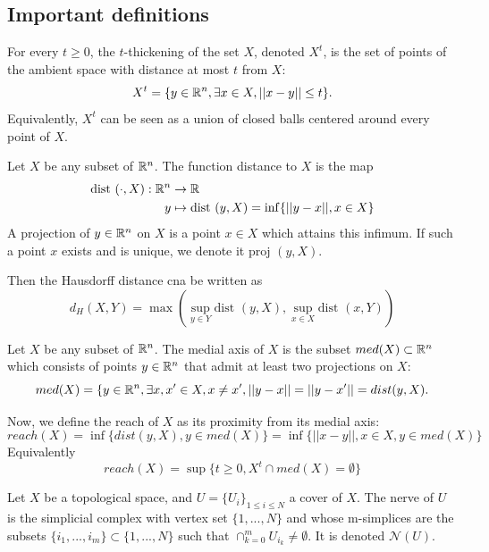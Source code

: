 \subsection{Important definitions}

\begin{definition}
    For every $t \ge 0$, the $t$-thickening of the set $X$, denoted $X^t$, is
    the set of points of the ambient space with distance at most $t$ from $X$:
    $$X^t = \{y \in \mathbb{R}^n, \exists x \in X, ||x - y|| \le t\}.$$
    Equivalently, $X^t$ can be seen as a union of closed balls centered around
    every point of $X$.
\end{definition}

\begin{definition}
    Let $X$ be any subset of $\mathbb{R}^n$. The function distance to $X$ is the map 
    \begin{align*}
        \text{dist }(\cdot, X) : \mathbb{R}^n &\rightarrow \mathbb{R} \\
        y &\mapsto \text{dist }(y, X) = \inf\{||y - x||, x \in X\}
    \end{align*}
    A projection of $y \in \mathbb{R}^n$ on $X$ is a point $x \in X$ which attains
    this infimum. If such a point $x$ exists and is unique, we denote it
    $\text{proj }(y, X)$. 

    Then the Hausdorff distance cna be written as 
    $$
    d_H(X, Y) = \max(\sup_{y\in Y} \text{dist }(y, X), \sup_{x\in X} \text{dist }(x, Y))$$
\end{definition}

\begin{definition}
    Let $X$ be any subset of $\mathbb{R}^n$. The medial axis of $X$ is the subset
    $med(X) \subset \mathbb{R}^n$ which consists of points $y \in \mathbb{R}^n$ that admit at
    least two projections on $X$:
    $$
    med(X) = \{y \in \mathbb{R}^n, \exists x, x' \in X, x \neq x', ||y - x|| = ||y - x'|| = dist(y, X)
    .$$
\end{definition}

\begin{definition}
    Now, we define the reach of $X$ as its proximity from its medial axis:
    $$
    reach(X) = \inf\{dist(y, X), y \in med (X)\} = \inf\{||x - y||, x \in X, y \in med (X)\}
    $$
    Equivalently
    $$
    reach(X) = \sup\{t \ge 0, X^t \cap med (X) = \emptyset\}
    $$
\end{definition}

\begin{definition}
    Let $X$ be a topological space, and $U = \{U_i\}_{1\le i\le N}$ a cover of
    $X$. The nerve of $U$ is the simplicial complex with vertex set $\{1, ...,
    N\}$ and whose m-simplices are the subsets $\{i_1, ..., i_m\} \subset \{1,
    ..., N\}$ such that $\cap_{k=0}^m U_{i_k} \neq \emptyset$. It is denoted $\mathcal{N}(U)$.
\end{definition}

